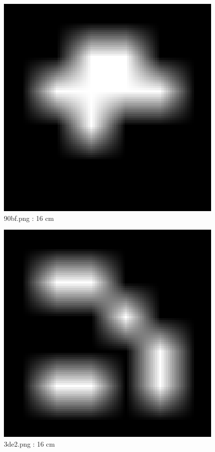 \documentclass[11pt,a4,BCOR=0cm]{scrartcl}
\begin{document}
\newpage
\begin{figure}
  \begin{center}
    \includegraphics[natwidth=6,natheight=6,width=16cm]{90bf.png}
    \caption{90bf.png : 16 cm}
    \label{fig:90bf.png}
  \end{center}
\end{figure}
\newpage
\begin{figure}
  \begin{center}
    \includegraphics[natwidth=6,natheight=6,width=16cm]{3de2.png}
    \caption{3de2.png : 16 cm}
    \label{fig:3de2.png}
  \end{center}
\end{figure}
\end{document}
